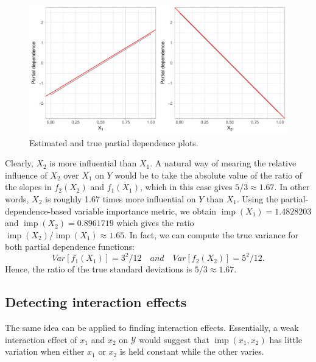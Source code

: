 \documentclass[12pt]{article}
\DeclareMathOperator{\imp}{imp}
\begin{document}
\begin{figure}[!htb]
  \label{lm-pdps}
  \centering
  \includegraphics[width=1.0\textwidth]{lm-pdps}
  \caption{Estimated and true partial dependence plots.}
\end{figure}

Clearly, $X_2$ is more influential than $X_1$. A natural way of mearing the relative influence of $X_2$ over $X_1$ on $Y$ would be to take the absolute value of the ratio of the slopes in $f_2\left(X_2\right)$ and $f_1\left(X_1\right)$, which in this case gives $5 / 3 \approx 1.67$. In other words, $X_2$ is roughly 1.67 times more influential on $Y$ than $X_1$. Using the partial-dependence-based variable importance metric, we obtain $\imp\left(X_1\right) = 1.4828203$ and $\imp\left(X_2\right) = 0.8961719$ which gives the ratio $\imp\left(X_2\right) / \imp\left(X_1\right) \approx 1.65$. In fact, we can compute the true variance for both partial dependence functions:
\begin{equation*}
Var\left[f_1\left(X_1\right)\right] = 3^2 / 12 \quad and \quad Var\left[f_2\left(X_2\right)\right] = 5^2 / 12.
\end{equation*}
Hence, the ratio of the true standard deviations is $5 / 3 \approx 1.67$.


\subsection{Detecting interaction effects}
\label{sec:interaction}

The same idea can be applied to finding interaction effects. Essentially, a weak interaction effect of $x_1$ and $x_2$ on $\mathcal{Y}$ would suggest that $\imp\left(x_1, x_2\right)$ has little variation when either $x_1$ or $x_2$ is held constant while the other varies. 
\end{document}
